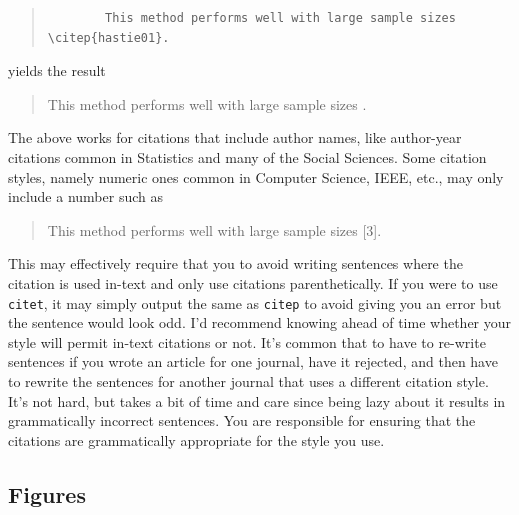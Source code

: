 \documentclass[12pt]{article}
\begin{document}
\begin{quotation}
	\begin{verbatim}
		This method performs well with large sample sizes \citep{hastie01}.
	\end{verbatim}
\end{quotation}
	yields the result

\begin{quotation}
		This method performs well with large sample sizes \citep{hastie01}.
\end{quotation}

The above works for citations that include author names, like author-year citations common in Statistics and many of the Social Sciences. Some citation styles, namely numeric ones common in Computer Science, IEEE, etc., may only include a number such as

\begin{quotation}
	This method performs well with large sample sizes [3].
\end{quotation}


This may effectively require that you to avoid writing sentences where the citation is used in-text and only use citations parenthetically. If you were to use \texttt{citet}, it may simply output the same as \texttt{citep} to avoid giving you an error but the sentence would look odd. I'd recommend knowing ahead of time whether your style will permit in-text citations or not. It's common that to have to re-write sentences if you wrote an article for one journal, have it rejected, and then have to rewrite the sentences for another journal that uses a different citation style. It's not hard, but takes a bit of time and care since being lazy about it results in grammatically incorrect sentences. You are responsible for ensuring that the citations are grammatically appropriate for the style you use.

\subsection {Figures}
\end{document}
